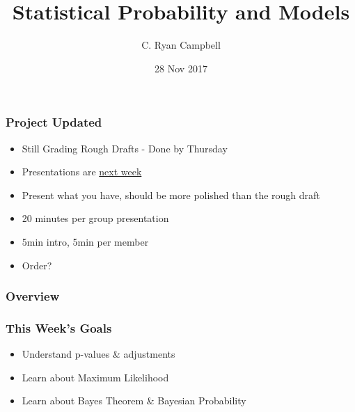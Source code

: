 \documentclass[14pt,handout]{beamer}
\title[Probability and Models]{Statistical Probability and Models} %
\author{C. Ryan Campbell} %
\institute[Duke] %
{
Duke University \\ %
\medskip
\textit{c.ryan.campbell@duke.edu} %
}
\date{28 Nov 2017} %
\begin{document}
\begin{frame}
\titlepage %
\end{frame}

\begin{frame}
\frametitle{Project Updated}
\begin{itemize}
	\item<+-> Still Grading Rough Drafts - Done by Thursday
	\item<+-> Presentations are \underline{next week}
	\item<+-> Present what you have, should be more polished than the rough draft
	\item<+-> 20 minutes per group presentation
	\item<+-> 5min intro, 5min per member
	\item<+-> Order?
\end{itemize}
\end{frame}


\begin{frame}
\frametitle{Overview} %
\tableofcontents %
\end{frame}


\begin{frame}
\frametitle{This Week's Goals}
\begin{itemize}
	\item<+-> Understand p-values \& adjustments
	\item<+-> Learn about Maximum Likelihood
	\item<+-> Learn about Bayes Theorem \& Bayesian Probability
\end{itemize}
\end{frame}
\end{document}
